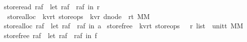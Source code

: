 \begin{isabellebody}
{\isachardoublequoteopen}store{\isacharunderscore}read\ raf\ {\isacharequal}\ {\isacharparenleft}let\ {\isacharparenleft}r{\isacharcomma}a{\isacharcomma}f{\isacharparenright}\ {\isacharequal}\ raf\ in\ r{\isacharparenright}{\isachardoublequoteclose}\isanewline
\isanewline
{}\isamarkupfalse%
\ store{\isacharunderscore}alloc\ {\isacharcolon}{\isacharcolon}\ {\isachardoublequoteopen}{\isacharparenleft}{\isacharprime}k{\isacharcomma}{\isacharprime}v{\isacharcomma}{\isacharprime}r{\isacharcomma}{\isacharprime}t{\isacharparenright}\ store{\isacharunderscore}ops\ {\isacharequal}{\isachargreater}\ {\isacharparenleft}{\isacharparenleft}{\isacharprime}k{\isacharcomma}{\isacharprime}v{\isacharcomma}{\isacharprime}r{\isacharparenright}\ dnode\ {\isasymRightarrow}\ {\isacharparenleft}{\isacharprime}r{\isacharcomma}{\isacharprime}t{\isacharparenright}\ MM{\isacharparenright}{\isachardoublequoteclose}\ \isanewline
{\isachardoublequoteopen}store{\isacharunderscore}alloc\ raf\ {\isacharequal}\ {\isacharparenleft}let\ {\isacharparenleft}r{\isacharcomma}a{\isacharcomma}f{\isacharparenright}\ {\isacharequal}\ raf\ in\ a{\isacharparenright}{\isachardoublequoteclose}\isanewline
\isanewline
{}\isamarkupfalse%
\ store{\isacharunderscore}free\ {\isacharcolon}{\isacharcolon}\ {\isachardoublequoteopen}{\isacharparenleft}{\isacharprime}k{\isacharcomma}{\isacharprime}v{\isacharcomma}{\isacharprime}r{\isacharcomma}{\isacharprime}t{\isacharparenright}\ store{\isacharunderscore}ops\ {\isacharequal}{\isachargreater}\ \ {\isacharparenleft}{\isacharprime}r\ list\ {\isasymRightarrow}\ {\isacharparenleft}unit{\isacharcomma}{\isacharprime}t{\isacharparenright}\ MM{\isacharparenright}{\isachardoublequoteclose}\ \isanewline
{\isachardoublequoteopen}store{\isacharunderscore}free\ raf\ {\isacharequal}\ {\isacharparenleft}let\ {\isacharparenleft}r{\isacharcomma}a{\isacharcomma}f{\isacharparenright}\ {\isacharequal}\ raf\ in\ f{\isacharparenright}{\isachardoublequoteclose}\isanewline
\isanewline
%
\isadelimtheory
\isanewline
%
\endisadelimtheory
%
\isatagtheory
{}\isamarkupfalse%
%
\endisatagtheory
{\isafoldtheory}%
%
\isadelimtheory
%
\endisadelimtheory
\end{isabellebody}%
